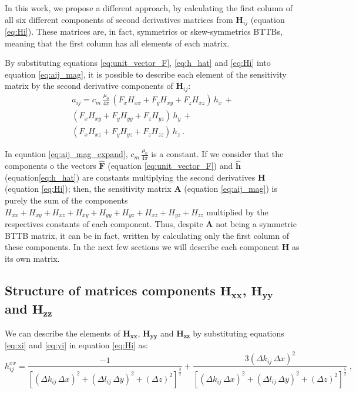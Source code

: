 In this work, we propose a different approach, by calculating the first column of all six different components of second derivatives matrices from $\mathbf{H}_{ij}$ (equation \ref{eq:Hi}). These matrices are, in fact, symmetrics or skew-symmetrics BTTBs, meaning that the first column has all elements of each matrix.

By substituting equations \ref{eq:unit_vector_F}, \ref{eq:h_hat} and \ref{eq:Hi} into equation \ref{eq:aij_mag}, it is possible to describe each element of the sensitivity matrix by the second derivative components of $\mathbf{H}_{ij}$:
\begin{equation}
\begin{split}
a_{ij} = c_{m} \, \frac{\mu_{0}}{4\pi} \, (F_x H_{xx} + F_y H_{xy} + F_z H_{xz}) \, h_x  \, + \\
(F_x H_{xy} + F_y H_{yy} + F_z H_{yz}) \, h_y  \, + \\
(F_x H_{xz} + F_y H_{yz} + F_z H_{zz}) \, h_z \: .
\end{split}
\label{eq:aij_mag_expand}
\end{equation}

In equation \ref{eq:aij_mag_expand}, $c_{m} \, \frac{\mu_{0}}{4\pi}$ is a constant.
If we consider that the components o the vectors 
$\hat{\mathbf{F}}$ (equation \ref{eq:unit_vector_F}) and $\hat{\mathbf{h}}$ (equation\ref{eq:h_hat}) are constants multiplying the second derivatives $\mathbf{H}$ (equation \ref{eq:Hi}); then, 
the sensitivity matrix $\mathbf{A}$ (equation \ref{eq:aij_mag}) is purely the sum of the components $H_{xx} + H_{xy} + H_{xz} + H_{xy} + H_{yy} + H_{yz} + H_{xz} + H_{yz} + H_{zz}$ multiplied by the respectives constants of each component. Thus, despite $\mathbf{A}$ not being a symmetric BTTB matrix, it can be in fact, written by calculating only the first column of these components.
In the next few sections we will describe each component $\mathbf{H}$ as its own matrix.

\subsection{Structure of matrices components $\mathbf{H_{xx}}$, $\mathbf{H_{yy}}$ and $\mathbf{H_{zz}}$}

We can describe the elements of $\mathbf{H_{xx}}$, $\mathbf{H_{yy}}$ and $\mathbf{H_{zz}}$ by substituting equations \ref{eq:xi} and \ref{eq:yi} in equation \ref{eq:Hi}  as:
\begin{equation}
h^{xx}_{ij} = \frac{-1}{ \left[ 
		\left( \Delta k_{ij} \, \Delta x \right)^{2} + 
		\left( \Delta l_{ij} \, \Delta y \right)^{2} + 
		\left( \Delta z \right)^{2} \right]^{\frac{3}{2}}} + 
		\frac{3 (\Delta k_{ij} \, \Delta x )^{2}}{\left[ 
		\left( \Delta k_{ij} \, \Delta x \right)^{2} + 
		\left( \Delta l_{ij} \, \Delta y \right)^{2} + 
		\left( \Delta z \right)^{2} \right]^{\frac{5}{2}}} \: ,
\label{eq:hxx_mag}
\end{equation}

